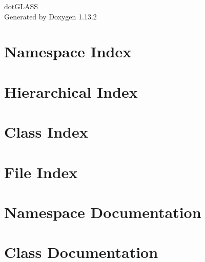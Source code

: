 \documentclass[twoside]{book}
\newcommand{\+}{\discretionary{\mbox{\scriptsize$\hookleftarrow$}}{}{}}
\newcommand{\clearemptydoublepage}{%
    \newpage{\pagestyle{empty}\cleardoublepage}%
  }
\begin{document}
  \raggedbottom
    \hypersetup{pageanchor=false,
                bookmarksnumbered=true,
                pdfencoding=unicode
               }
  \begin{titlepage}
  \vspace*{7cm}
  \begin{center}%
  {\Large dot\+GLASS}\\
  \vspace*{1cm}
  {\large Generated by Doxygen 1.13.2}\\
  \end{center}
  \end{titlepage}
  \clearemptydoublepage
  \tableofcontents
  \clearemptydoublepage
  \hypersetup{pageanchor=true}

\chapter{Namespace Index}

\chapter{Hierarchical Index}

\chapter{Class Index}

\chapter{File Index}

\chapter{Namespace Documentation}



\chapter{Class Documentation}

















\end{document}
